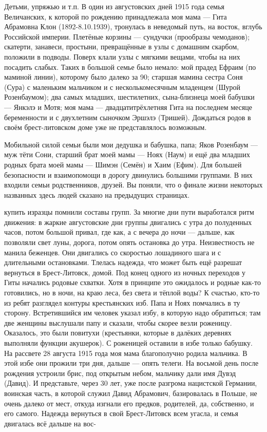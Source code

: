 Детьми, упряжью и т.п. В один из августовских дней 1915 года семья Величанских, к которой по рождению принадлежала моя мама — Гита Абрамовна Клон (1892-8.10.1939), тронулась в неведомый путь, на восток, вглубь Российской империи. Плетёные корзины — сундучки (прообразы чемоданов); скатерти, занавеси, простыни, превращённые в узлы с домашним скарбом, положили в подводы. Поверх клали узлы с мягкими вещами, чтобы на них посадить слабых. Таких в большой семье было немало: мой прадед Ефраим (по маминой линии), которому было далеко за 90; старшая мамина сестра Соня (Сура) с маленьким мальчиком и с несколькомесячным младенцем (Шурой Розенбаумом); два самых младших, шестилетних, сына-близнеца моей бабушки — Янкэлэ и Мотя; моя мама — двадцатитрёхлетняя Гита на последнем месяце беременности и с двухлетним сыночком Эршэлэ (Тришей). Дождаться родов в своём брест-литовском доме уже не представлялось возможным.

Мобильной силой семьи были мои дедушка и бабушка, папа; Яков Розенбаум — муж тёти Сони, старший брат моей мамы — Ноях (Наум) и ещё два младших родных брата моей мамы — Шимэн (Семён) и Хаим (Ефим). Для большей безопасности и взаимопомощи в дорогу двинулись большими группами. В них входили семьи родственников, друзей. Вы поняли, что о финале жизни некоторых названных здесь людей сказано на предыдущих страницах.

купить изразцы помнили составы групп. За многие дни пути выработался ритм движения: в жаркие августовские дни группы двигались с утра до полуденных часов, потом большой привал, где как, а с вечера до ночи — дальше, как позволяли свет луны, дорога, потом опять остановка до утра. Неизвестность не манила беженцев. Они двигались со скоростью лошадиного шага и с длительными остановками. Тлелась надежда, что может быть ещё разрешат вернуться в Брест-Литовск, домой. Под конец одного из ночных переходов у Гиты начались родовые схватки. Хотя в принципе это ожидалось и родные как-то готовились, но в ночи, на краю леса, без света и тёплой воды? К счастью, кто-то из ребят разглядел контуры крестьянских изб. Папа и Ноях помчались в ту сторону. Встретившийся им человек указал избу, в которую надо обратиться; там две женщины выслушали папу и сказали, чтобы скорее везли роженицу. Оказалось, это были повитухи (крестьянки, которые в далёких деревнях выполняли функции акушерок). С роженицей оставили в избе только бабушку. На рассвете 28 августа 1915 года моя мама благополучно родила мальчика. В этой избе они прожили три дня, дальше — опять телеги. На восьмой день после рождения устроили брис, под открытым небом, мальчику дали имя Дувэд (Давид). И представьте, через 30 лет, уже после разгрома нацистской Германии, воинская часть, в которой служил Давид Абрамович, базировалась в Польше, не очень далеко от мест, откуда изгнали его предков, родителей, да, собственно, и его самого. Надежда вернуться в свой Брест-Литовск всем угасла, и семья двигалась всё дальше на вос-

